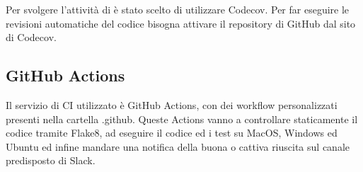 Per svolgere l'attività di  è stato scelto di utilizzare Codecov. Per far eseguire le revisioni automatiche del codice bisogna attivare il repository di GitHub dal sito di Codecov.

\subsection{GitHub Actions}
Il servizio di CI utilizzato è GitHub Actions, con dei workflow personalizzati presenti nella cartella .github. Queste Actions vanno a controllare staticamente il codice tramite Flake8, ad eseguire il codice ed i test su MacOS, Windows ed Ubuntu ed infine mandare una notifica della buona o cattiva riuscita sul canale predisposto di Slack.